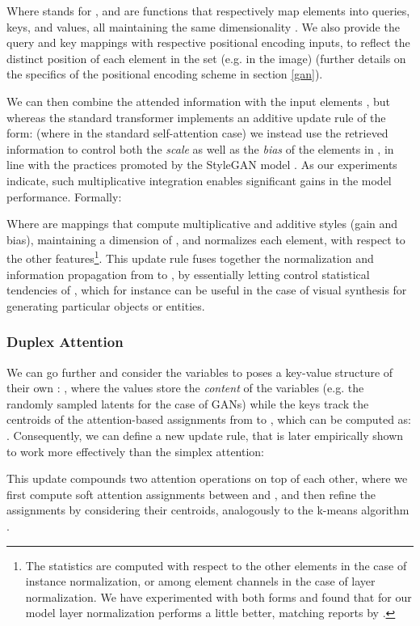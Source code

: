 \documentclass{article}
\begin{document}
Where  stands for , and  are functions that respectively map elements into queries, keys, and values, all maintaining the same dimensionality . We also provide the query and key mappings with respective positional encoding inputs, to reflect the distinct position of each element in the set (e.g. in the image) (further details on the specifics of the positional encoding scheme in section \ref{gan}).

We can then combine the attended information with the input elements , but whereas the standard transformer implements an additive update rule of the form:  (where  in the standard self-attention case) we instead use the retrieved information to control both the \textit{scale} as well as the \textit{bias} of the elements in , in line with the practices promoted by the StyleGAN model \citep{stylegan}. As our  experiments indicate, such multiplicative integration enables significant gains in the model performance. Formally:

Where  are mappings that compute multiplicative and additive styles (gain and bias), maintaining a dimension of , and  normalizes each element, with respect to the other features\footnote{The statistics are computed with respect to the other elements in the case of instance normalization, or among element channels in the case of layer normalization. We have experimented with both forms and found that for our model layer normalization performs a little better, matching reports by \citep{gannorm}.}. This update rule fuses together the normalization and information propagation from  to , by essentially letting  control  statistical tendencies  of , which for instance can be useful in the case of visual synthesis for generating particular objects or entities. 

\subsubsection{Duplex Attention}
We can go further and consider the variables  to poses a key-value structure of their own \citep{kvmn}: , where the values store the \textit{content} of the  variables (e.g. the randomly sampled latents for the case of GANs) while the keys track the centroids of the attention-based assignments from  to , which can be computed as: . Consequently, we can define a new update rule, that is later empirically shown to work more effectively than the simplex attention:

This update compounds two attention operations on top of each other, where we first compute soft attention assignments between  and , and then refine the assignments by considering their centroids, analogously to the k-means algorithm \citep{kmeans,slotatt}.
\end{document}
